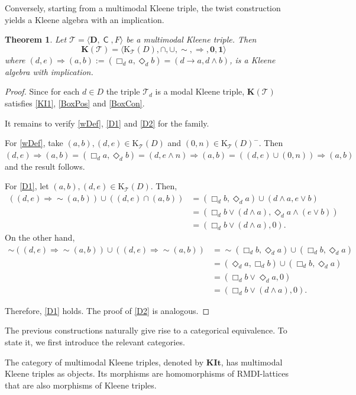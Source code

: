 \documentclass{article}
\newtheorem{theorem}{Theorem}[section]
\DeclareMathOperator{\con}{\mathsf{C}}
\newcommand{\KC}[1]{\mathrm{K}_\T(#1)}
\newcommand{\one}{\mathbf{1}}
\newcommand{\zero}{\mathbf{0}}
\newcommand{\D}{\mathbf{D}}
\newcommand{\T}{\mathcal{T}}
\begin{document}
Conversely, starting from a multimodal Kleene triple, the twist construction yields a Kleene algebra with an implication.

\begin{theorem}
\label{thm:twist-modal-family}
Let $\mathcal{T}=\langle \D,\con,F\rangle$ be a multimodal Kleene triple. Then \[
\mathbf{K}(\mathcal{T})=\langle\KC{D},\cap,\cup,\sim,\Rightarrow,\zero,\one\rangle
\]
where $(d,e)\Rightarrow (a,b) := (\Box_d a, \Diamond_d b)=(d\rightarrow a,d\wedge b)$, is a Kleene algebra with implication.
\end{theorem}
\begin{proof}
Since for each $d\in D$ the triple $\mathcal{T}_d$ is a modal Kleene triple, $\mathbf{K}(\mathcal{T})$ satisfies \eqref{KI1}, \eqref{BoxPos} and \eqref{BoxCon}. 

It remains to
verify \eqref{wDef}, \eqref{D1} and \eqref{D2} for the family.

For \eqref{wDef}, take $(a,b), (d,e) \in \KC{D}$ and $(0,n)\in \KC{D}^-$. Then $(d,e)\Rightarrow (a,b) = (\Box_d a,\Diamond_d b)=(d,e\wedge n)\Rightarrow (a,b)=((d,e)\cup (0,n))\Rightarrow (a,b)$ and the result follows.

For \eqref{D1}, let $(a,b),(d,e)\in \KC{D}$. Then,
\begin{align*}
((d,e)\Rightarrow\sim (a,b))\cup((d,e)\cap (a,b))
    &=(\Box_db,\Diamond_d a)\cup (d\wedge a,e\vee b)\\
    &=(\Box_db \vee (d\wedge a),\Diamond_d a\wedge(e\vee b))\\
    &=(\Box_db \vee (d\wedge a),0).    
\end{align*}
On the other hand, 
\begin{align*}
    \sim ((d,e)\Rightarrow \sim (a,b))\cup  ((d,e)\Rightarrow \sim (a,b))
    &=\sim (\Box_db,\Diamond_d a)\cup (\Box_db,\Diamond_d a)\\
    &=(\Diamond_d a,\Box_db)\cup (\Box_db,\Diamond_d a)\\
    &=(\Box_db \vee \Diamond_d a,0)\\
    &=(\Box_db \vee (d\wedge a),0). 
\end{align*}

Therefore, \eqref{D1} holds. The proof of \eqref{D2} is analogous.
\end{proof}

The previous constructions naturally give rise to a categorical equivalence. To state it, we first introduce the relevant categories.

The category of multimodal Kleene triples, denoted by $\mathbf{KIt}$, has multimodal Kleene triples as objects. Its morphisms are homomorphisms of RMDI-lattices that are also morphisms of Kleene triples.
\end{document}
